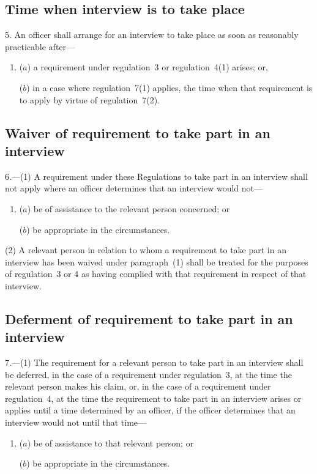 \documentclass[12pt,a4paper]{article}
\begin{document}
\subsection[5. Time when interview is to take place]{Time when interview is to take place}

5.  An officer shall arrange for an interview to take place as soon as reasonably practicable after—
\begin{enumerate}\item[]
($a$) a requirement under regulation~3 or regulation~4(1) arises; or,

($b$) in a case where regulation~7(1) applies, the time when that requirement is to apply by virtue of regulation~7(2).
\end{enumerate}

\subsection[6. Waiver of requirement to take part in an interview]{Waiver of requirement to take part in an interview}

6.---(1)  A requirement under these Regulations to take part in an interview shall not apply where an officer determines that an interview would not—
\begin{enumerate}\item[]
($a$) be of assistance to the relevant person concerned; or

($b$) be appropriate in the circumstances.
\end{enumerate}

(2) A relevant person in relation to whom a requirement to take part in an interview has been waived under paragraph~(1) shall be treated for the purposes of regulation~3 or 4 as having complied with that requirement in respect of that interview.

\subsection[7. Deferment of requirement to take part in an interview]{Deferment of requirement to take part in an interview}

7.---(1)  The requirement for a relevant person to take part in an interview shall be deferred, in the case of a requirement under regulation~3, at the time the relevant person makes his claim, or, in the case of a requirement under regulation~4, at the time the requirement to take part in an interview arises or applies until a time determined by an officer, if the officer determines that an interview would not until that time—
\begin{enumerate}\item[]
($a$) be of assistance to that relevant person; or

($b$) be appropriate in the circumstances.
\end{enumerate}
\end{document}
